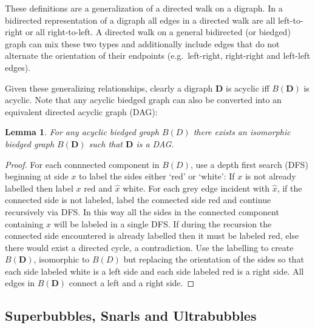 \documentclass[11pt]{ucthesis}
\newtheorem{lemma}{Lemma}
\newtheorem*{proof}{Proof}
\begin{document}
These definitions are a generalization of a directed walk on a digraph. In a bidirected representation of a digraph all edges in a directed walk are all left-to-right or all right-to-left. A directed walk on a general bidirected (or biedged) graph can mix these two types and additionally include edges that do not alternate the orientation of their endpoints (e.g.\ left-right, right-right and left-left edges). 

Given these generalizing relationships, clearly a digraph $\textbf{D}$ is acyclic iff $B(\textbf{D})$ is acyclic. Note that any acyclic biedged graph can also be converted into an equivalent directed acyclic graph (DAG):

\begin{lemma}
For any acyclic biedged graph $B(D)$ there exists an isomorphic biedged graph $B(\textbf{D})$ such that $\textbf{D}$ is a DAG.
\label{lemma_acyclic_biedged_graph_is_dag}
\end{lemma}
\begin{proof}
For each connnected component in $B(D)$, use a depth first search (DFS) beginning at side $x$ to label the sides either `red' or `white':  If $x$ is not already labelled then label $x$ red and $\hat{x}$ white. For each grey edge incident with $\hat{x}$, if the connected side is not labeled, label the connected side red and continue recursively via DFS. In this way all the sides in the connected component containing $x$ will be labeled in a single DFS. If during the recursion the connected side encountered is already labelled then it must be labeled red, else there would exist a directed cycle, a contradiction. Use the labelling to create $B(\textbf{D})$, isomorphic to $B(D)$  but replacing the orientation of the sides so that each side labeled white is a left side and each side labeled red is a right side. All edges in $B(\textbf{D})$ connect a left and a right side.
\end{proof}

\subsection{Superbubbles, Snarls and Ultrabubbles}

\end{document}
